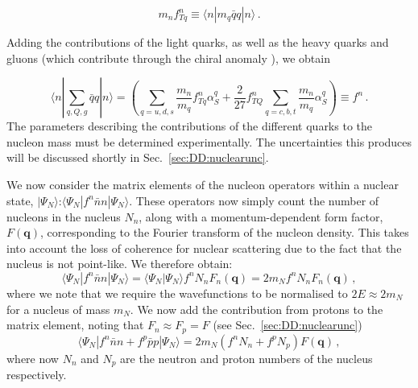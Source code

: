 \begin{equation}
m_n f_{Tq}^n \equiv \langle n|m_q\bar{q}q|n \rangle \,.
\end{equation}

Adding the contributions of the light quarks, as well as the heavy quarks and gluons (which contribute through the chiral anomaly \cite{Shifman:1978}), we obtain

\begin{equation}
\langle n| \sum_{q,Q,g} \bar{q} q |n \rangle  = \left(\sum_{q=u,d,s}\frac{m_n}{m_q} f_{Tq}^n \alpha_S^q + \frac{2}{27} f_{TQ}^n \sum_{q = c,b,t} \frac{m_n}{m_q} \alpha_S^q\right) \equiv f^n\,.
\end{equation}
The parameters describing the contributions of the different quarks to the nucleon mass must be determined experimentally. The uncertainties this produces will be discussed shortly in Sec.~\ref{sec:DD:nuclearunc}.


We now consider the matrix elements of the nucleon operators within a nuclear state, $|\Psi_N\rangle$:$\langle \Psi_N|f^n \bar{n}n|\Psi_N\rangle$. These operators now simply count the number of nucleons in the nucleus $N_n$, along with a momentum-dependent form factor, $F(\textbf{q})$, corresponding to the Fourier transform of the nucleon density. This takes into account the loss of coherence for nuclear scattering due to the fact that the nucleus is not point-like. We therefore obtain:
\begin{equation}
\langle \Psi_N|f^n \bar{n}n|\Psi_N\rangle = \langle \Psi_N|\Psi_N\rangle f^n N_n F_n(\textbf{q}) = 2m_N f^n N_n F_n(\textbf{q})\,,
\end{equation}
where we note that we require the wavefunctions to be normalised to \(2E \approx 2m_N\) for a nucleus of mass \(m_N\). We now add the contribution from protons to the matrix element, noting that \(F_n \approx F_p = F\) (see Sec.~\ref{sec:DD:nuclearunc})
\begin{equation}
\langle \Psi_N|f^n \bar{n}n + f^p \bar{p}p|\Psi_N\rangle = 2m_N (f^n N_n + f^p N_p) F(\textbf{q})\,,
\end{equation}
where now $N_n$ and $N_p$ are the neutron and proton numbers of the nucleus respectively.

